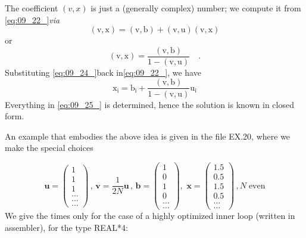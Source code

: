 The coefficient $(v, x)$ is just a (generally complex) number; we compute it from \ref{eq:09_22_}\textit{via}
\begin{equation}
 \label{eq:09_23_}
    \mathrm{(v,x)=(v,b)+(v,u)(v,x)}
\end{equation}
or
\begin{equation}
 \label{eq:09_24_}
    \mathrm{(v,x)=\frac{(v,b)}{1-(v,u)}\quad .}
\end{equation}
Substituting \ref{eq:09_24_}back in\ref{eq:09_22_}, we have
\begin{equation}
 \label{eq:09_25_}
    \mathrm{x_i=b_i+\frac{(v,b)}{1-(v,u)}u_i}
\end{equation}
Everything in \ref{eq:09_25_} is determined, hence the solution is known in
closed form.

An example that embodies the above idea is given in the file EX.20, where we make the special choices

\begin{equation*}
    \mathbf{u}=
    \begin{pmatrix}
        1\\ 
        1\\ 
        1\\ 
        \dots\\ 
        \dots\\ 
        \dots
    \end{pmatrix}
    \, ,\, 
    \mathbf{v}=\frac{1}{2N} \mathbf{u}\, , \, 
    \mathbf{b} =
    \begin{pmatrix}
        1\\ 
        0\\ 
        1\\ 
        0\\ 
        \dots\\ 
        \dots
    \end{pmatrix}
    ,\, \,  
    \mathbf{x}=
    \begin{pmatrix}
        1.5\\ 
        0.5\\ 
        1.5\\ 
        0.5\\ 
        \dots\\ 
        \dots
    \end{pmatrix}
    \, , N \; \textrm{even}
\end{equation*}
We give the times only for the case of a highly optimized inner
loop (written in assembler), for the type REAL*4:

